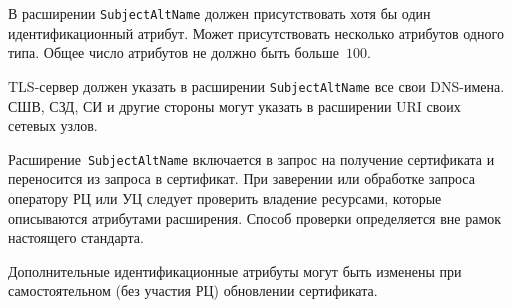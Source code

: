 В расширении \texttt{SubjectAltName} должен присутствовать хотя бы один 
идентификационный атрибут. Может присутствовать несколько атрибутов одного 
типа. Общее число атрибутов не должно быть больше~$100$.

TLS-сервер должен указать в расширении \texttt{SubjectAltName}
все свои DNS-имена. СШВ, СЗД, СИ и другие стороны могут указать в 
расширении URI своих сетевых узлов.

Расширение~\texttt{SubjectAltName} включается в запрос на получение
сертификата и переносится из запроса в сертификат. При заверении
или обработке запроса оператору РЦ или УЦ следует проверить владение 
ресурсами, которые описываются атрибутами расширения. 
%
Способ проверки определяется вне рамок настоящего стандарта.

Дополнительные идентификационные атрибуты могут быть изменены при 
самостоятельном (без участия РЦ) обновлении сертификата.

